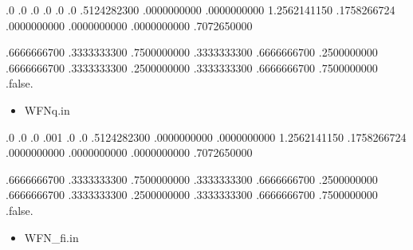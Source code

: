 \documentclass[a4paper,12pt,english]{sphinxmanual}
\begin{document}
\begin{sphinxVerbatim}[commandchars=\\\{\}]
               
.0  .0  .0
.0  .0  .0
      .5124282300       .0000000000       .0000000000  
     \PYGZhy{}1.2562141150       .1758266724       .0000000000  
      .0000000000       .0000000000       .7072650000  

 
      .6666666700       .3333333300       .7500000000 
      .3333333300       .6666666700       .2500000000 
      .6666666700       .3333333300       .2500000000 
      .3333333300       .6666666700       .7500000000 
   
.false.
\end{sphinxVerbatim}
\begin{itemize}
\item {} 
\sphinxAtStartPar
WFNq.in

\end{itemize}

\begin{sphinxVerbatim}[commandchars=\\\{\}]
      
.0    .0  .0
.001  .0  .0 
      .5124282300       .0000000000       .0000000000
     \PYGZhy{}1.2562141150       .1758266724       .0000000000
      .0000000000       .0000000000       .7072650000

      .6666666700       .3333333300       .7500000000
      .3333333300       .6666666700       .2500000000
      .6666666700       .3333333300       .2500000000
      .3333333300       .6666666700       .7500000000
  
.false.
\end{sphinxVerbatim}
\begin{itemize}
\item {} 
\sphinxAtStartPar
WFN\_fi.in

\end{itemize}
\end{document}
